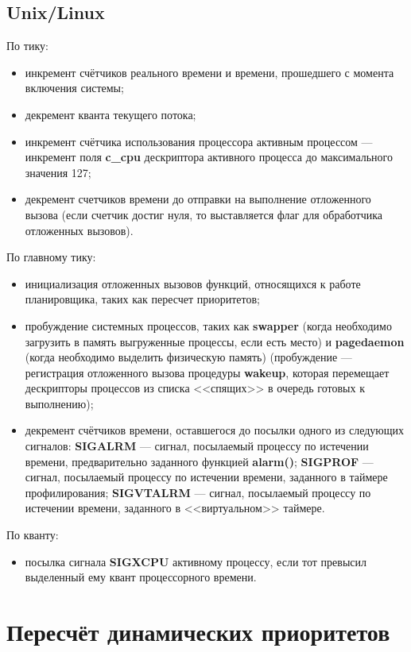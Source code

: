 \documentclass[a4paper,14pt]{extarticle}
\begin{document}
\subsection{Unix/Linux}
По тику:
\begin{itemize}
	\item инкремент счётчиков реального времени и времени, прошедшего с момента включения системы;
	\item декремент кванта текущего потока;
	\item инкремент счётчика использования процессора активным процессом --- инкремент поля \textbf{c\_cpu} дескриптора активного процесса до максимального значения 127;
    \item декремент счетчиков времени до отправки на выполнение отложенного вызова (если счетчик достиг нуля, то выставляется флаг для обработчика отложенных вызовов).
\end{itemize}
По главному тику:
\begin{itemize}
	\item инициализация отложенных вызовов функций, относящихся к работе планировщика, таких как пересчет приоритетов;
	\item пробуждение системных процессов, таких как \textbf{swapper} (когда необходимо загрузить в память выгруженные процессы, если есть место) и \textbf{pagedaemon} (когда необходимо выделить физическую память) (пробуждение --- регистрация отложенного вызова процедуры \textbf{wakeup}, которая перемещает дескрипторы процессов из списка <<спящих>> в очередь готовых к выполнению);
	\item декремент счётчиков времени, оставшегося до посылки одного из следующих сигналов:
        \subitem \textbf{SIGALRM} --- сигнал, посылаемый процессу по истечении времени, предварительно заданного функцией \textbf{alarm()};
        \subitem \textbf{SIGPROF} --- сигнал, посылаемый процессу по истечении времени, заданного в таймере профилирования;
        \subitem \textbf{SIGVTALRM} --- сигнал, посылаемый процессу по истечении времени, заданного в <<виртуальном>> таймере.
\end{itemize}
По кванту:
\begin{itemize}
	\item посылка сигнала \textbf{SIGXCPU} активному процессу, если тот превысил выделенный ему квант процессорного времени.
\end{itemize}

\section{Пересчёт динамических приоритетов}
\end{document}
